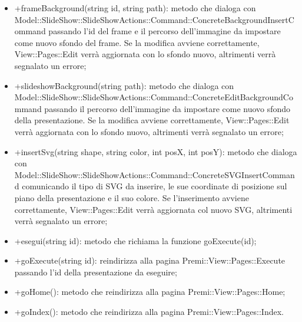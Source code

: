 {{\begin{itemize}
						\item +frameBackground(string id, string path): metodo che dialoga con Model::SlideShow::SlideShowActions::Command::ConcreteBackgroundInsertCommand passando l'id del frame e il percorso dell'immagine da impostare come nuovo sfondo del frame. Se la modifica avviene correttamente, View::Pages::Edit verrà aggiornata con lo sfondo nuovo, altrimenti verrà segnalato un errore;
						\item +slideshowBackground(string path): metodo che dialoga con Model::SlideShow::SlideShowActions::Command::ConcreteEditBackgroundCommand passando il percorso dell'immagine da impostare come nuovo sfondo della presentazione. Se la modifica avviene correttamente, View::Pages::Edit verrà aggiornata con lo sfondo nuovo, altrimenti verrà segnalato un errore;
						\item +insertSvg(string shape, string color, int posX, int posY): metodo che dialoga con Model::SlideShow::SlideShowActions::Command::ConcreteSVGInsertCommand comunicando il tipo di SVG da inserire, le sue coordinate di posizione sul piano della presentazione e il suo colore. Se l'inserimento avviene correttamente, View::Pages::Edit verrà aggiornata col nuovo SVG, altrimenti verrà segnalato un errore;
						\item +esegui(string id): metodo che richiama la funzione goExecute(id);
						\item +goExecute(string id): reindirizza alla pagina Premi::View::Pages::Execute passando l'id della presentazione da eseguire;
						\item +goHome(): metodo che reindirizza alla pagina Premi::View::Pages::Home;
						\item +goIndex(): metodo che reindirizza alla pagina Premi::View::Pages::Index.
					\end{itemize}
				}
				}